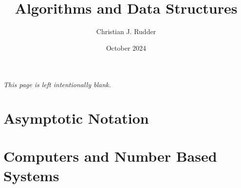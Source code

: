 \documentclass{memoir}
\title{Algorithms and Data Structures}
\author{Christian J. Rudder}
\date{October 2024}
\begin{document}
\maketitle
\setcounter{tocdepth}{2}

\tableofcontents

\newpage
\thispagestyle{empty}
\mbox{}
\vfill
\begin{center}
    \textit{This page is left intentionally blank.}
\end{center}
\vfill
\newpage


\chapter{Asymptotic Notation}

\chapter{Computers and Number Based Systems}



\end{document}
